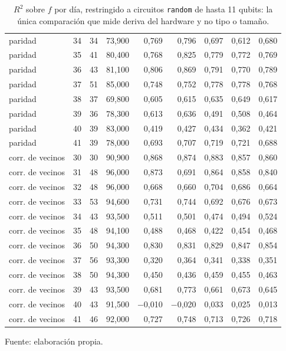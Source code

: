 \begin{table}[htbp]
{\begin{tabular}{@{}lrrrrrrrr@{}}
        paridad & 34 & 34 & 73,900 & 0,769 & 0,796 & 0,697 & 0,612 & 0,680 \\
        paridad & 35 & 41 & 80,400 & 0,768 & 0,825 & 0,779 & 0,772 & 0,769 \\
        paridad & 36 & 43 & 81,100 & 0,806 & 0,869 & 0,791 & 0,770 & 0,789 \\
        paridad & 37 & 51 & 85,000 & 0,748 & 0,752 & 0,778 & 0,778 & 0,768 \\
        paridad & 38 & 37 & 69,800 & 0,605 & 0,615 & 0,635 & 0,649 & 0,617 \\
        paridad & 39 & 36 & 78,300 & 0,613 & 0,636 & 0,491 & 0,508 & 0,464 \\
        paridad & 40 & 39 & 83,000 & 0,419 & 0,427 & 0,434 & 0,362 & 0,421 \\
        paridad & 41 & 39 & 78,000 & 0,693 & 0,707 & 0,719 & 0,721 & 0,688 \\
        corr. de vecinos & 30 & 30 & 90,900 & 0,868 & 0,874 & 0,883 & 0,857 & 0,860 \\
        corr. de vecinos & 31 & 48 & 96,000 & 0,873 & 0,691 & 0,864 & 0,858 & 0,840 \\
        corr. de vecinos & 32 & 48 & 96,000 & 0,668 & 0,660 & 0,704 & 0,686 & 0,664 \\
        corr. de vecinos & 33 & 53 & 94,600 & 0,731 & 0,744 & 0,692 & 0,676 & 0,673 \\
        corr. de vecinos & 34 & 43 & 93,500 & 0,511 & 0,501 & 0,474 & 0,494 & 0,524 \\
        corr. de vecinos & 35 & 48 & 94,100 & 0,488 & 0,468 & 0,422 & 0,454 & 0,468 \\
        corr. de vecinos & 36 & 50 & 94,300 & 0,830 & 0,831 & 0,829 & 0,847 & 0,854 \\
        corr. de vecinos & 37 & 56 & 93,300 & 0,320 & 0,364 & 0,341 & 0,338 & 0,351 \\
        corr. de vecinos & 38 & 50 & 94,300 & 0,450 & 0,436 & 0,459 & 0,455 & 0,463 \\
        corr. de vecinos & 39 & 43 & 93,500 & 0,681 & 0,773 & 0,661 & 0,673 & 0,645 \\
        corr. de vecinos & 40 & 43 & 91,500 & $-$0,010 & $-$0,020 & 0,033 & 0,025 & 0,013 \\
        corr. de vecinos & 41 & 46 & 92,000 & 0,727 & 0,748 & 0,713 & 0,726 & 0,718 \\
        \bottomrule
    \end{tabular}}

    \caption{$R^2$ sobre $f$ por día, restringido a circuitos \texttt{random} de hasta 11 qubits: la única comparación que mide deriva del hardware y no tipo o tamaño.}
    \label{tab:v2_deriva_r2}

    {\footnotesize Fuente: elaboración propia.}
\end{table}
